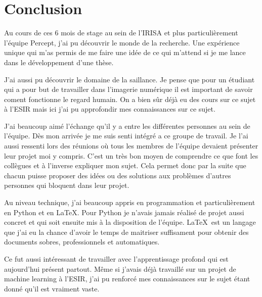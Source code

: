 \chapter{Conclusion}
\par
Au cours de ces 6 mois de stage au sein de l'IRISA et plus particulièrement l'équipe Percept, j'ai pu découvrir le monde de la recherche. Une expérience unique qui m'as permis de me faire une idée de ce qui m'attend si je me lance dans le développement d'une thèse.
\par
J'ai aussi pu découvrir le domaine de la saillance. Je pense que pour un étudiant qui a pour but de travailler dans l'imagerie numérique il est important de savoir coment fonctionne le regard humain. On a bien sûr déjà eu des cours sur ce sujet à l'ESIR mais ici j'ai pu approfondir mes connaissances sur ce sujet.
\par
J'ai beaucoup aimé l'échange qu'il y a entre les différentes personnes au sein de l'équipe. Dès mon arrivée je me suis senti intégré a ce groupe de travail. Je l'ai aussi ressenti lors des réunions où tous les membres de l'équipe devaient présenter leur projet moi y compris. C'est un très bon moyen de comprendre ce que font les collègues et à l'inverse expliquer mon sujet. Cela permet donc par la suite que chacun puisse proposer des idées ou des solutions aux problèmes d'autres personnes qui bloquent dans leur projet.
\par
Au niveau technique, j'ai beaucoup appris en programmation et particulièrement en Python et en \LaTeX. Pour Python je n'avais jamais réalisé de projet aussi concret et qui soit ensuite mis à la disposition de l'équipe. \LaTeX\ est un langage que j'ai eu la chance d'avoir le temps de maitriser suffisament pour obtenir des documents sobres, professionnels et automatiques.
\par
Ce fut aussi intéressant de travailler avec l'apprentissage profond qui est aujourd'hui présent partout. Même si j'avais déjà travaillé sur un projet de machine learning à l'ESIR, j'ai pu renforcé mes connaissances sur le sujet étant donné qu'il est vraiment vaste.